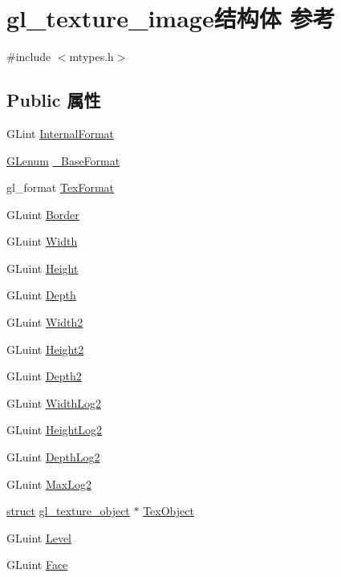 \hypertarget{structgl__texture__image}{}\section{gl\+\_\+texture\+\_\+image结构体 参考}
\label{structgl__texture__image}


{\ttfamily \#include $<$mtypes.\+h$>$}

\subsection*{Public 属性}
\begin{DoxyCompactItemize}
\item 
G\+Lint \hyperlink{structgl__texture__image_a751bb5023f9e5d258251482e8688552c}{Internal\+Format}
\item 
\hyperlink{interfacevoid}{G\+Lenum} \hyperlink{structgl__texture__image_a23c4c6cc37d46da9915958b9c8f9f9be}{\+\_\+\+Base\+Format}
\item 
gl\+\_\+format \hyperlink{structgl__texture__image_a910b87e255833f89c26ffd6e42fea008}{Tex\+Format}
\item 
G\+Luint \hyperlink{structgl__texture__image_a7330d1bc4b0c951a62fc4140e4c0f7b8}{Border}
\item 
G\+Luint \hyperlink{structgl__texture__image_a4beaa43b2d0ae457e9a1f56356946f1d}{Width}
\item 
G\+Luint \hyperlink{structgl__texture__image_ad0cd46eed7e3fe51d59bb649e5037dae}{Height}
\item 
G\+Luint \hyperlink{structgl__texture__image_a2bc8422726a784b5c101295edee63f05}{Depth}
\item 
G\+Luint \hyperlink{structgl__texture__image_a9724b743b168c804c080912c57e3961d}{Width2}
\item 
G\+Luint \hyperlink{structgl__texture__image_a62d6a9ac133354a9c022c182adaeb79c}{Height2}
\item 
G\+Luint \hyperlink{structgl__texture__image_a0a94f825d0045a2c063cf00d072dea91}{Depth2}
\item 
G\+Luint \hyperlink{structgl__texture__image_a9cdd9a992878f0f281f0336865290b69}{Width\+Log2}
\item 
G\+Luint \hyperlink{structgl__texture__image_afda895fd0f10eac420dd4f3633d8beb7}{Height\+Log2}
\item 
G\+Luint \hyperlink{structgl__texture__image_a40b95495f32aa068c3b8e60ca47af110}{Depth\+Log2}
\item 
G\+Luint \hyperlink{structgl__texture__image_a54ca8a30b80c45537e69c1aea2ef7b7a}{Max\+Log2}
\item 
\hyperlink{interfacestruct}{struct} \hyperlink{structgl__texture__object}{gl\+\_\+texture\+\_\+object} $\ast$ \hyperlink{structgl__texture__image_a7f92ed7e183543437ac6816195b0799b}{Tex\+Object}
\item 
G\+Luint \hyperlink{structgl__texture__image_ac6b1846545335abaa628607e3bd35e7b}{Level}
\item 
G\+Luint \hyperlink{structgl__texture__image_a6f00a299a0f065b64cdef797ec3d2930}{Face}
\end{DoxyCompactItemize}


